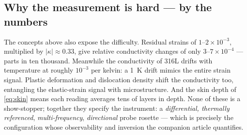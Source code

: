 \documentclass[11pt,a4paper]{article}
\begin{document}
\subsection{Why the measurement is hard --- by the numbers}
The concepts above also expose the difficulty. Residual strains of
$1$--$2\times10^{-3}$, multiplied by $|\kappa|\approx0.33$, give relative
conductivity changes of only $3$--$7\times10^{-4}$ --- parts in ten
thousand. Meanwhile the conductivity of 316L drifts with temperature at
roughly $10^{-3}$ per kelvin: a \SI{1}{\kelvin} drift mimics the entire
strain signal. Plastic deformation and dislocation density shift the
conductivity too, entangling the elastic-strain signal with
microstructure. And the skin depth of \cref{eq:skin} means each reading
averages tens of layers in depth. None of these is a show-stopper; together
they specify the instrument: a \emph{differential, thermally referenced},
\emph{multi-frequency}, \emph{directional} probe rosette --- which is
precisely the configuration whose observability and inversion the
companion article quantifies.
\end{document}
